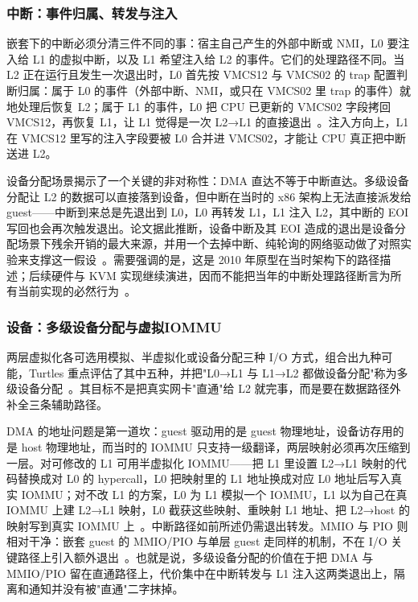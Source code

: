 \subsubsection{中断：事件归属、转发与注入}\label{sec:nested-irq}

嵌套下的中断必须分清三件不同的事：宿主自己产生的外部中断或 NMI，L0 要注入给 L1 的虚拟中断，以及 L1 希望注入给 L2 的事件。它们的处理路径不同。当 L2 正在运行且发生一次退出时，L0 首先按 VMCS12 与 VMCS02 的 trap 配置判断归属：属于 L0 的事件（外部中断、NMI，或只在 VMCS02 里 trap 的事件）就地处理后恢复 L2；属于 L1 的事件，L0 把 CPU 已更新的 VMCS02 字段拷回 VMCS12，再恢复 L1，让 L1 觉得是一次 L2→L1 的直接退出~\cite{source7}。注入方向上，L1 在 VMCS12 里写的注入字段要被 L0 合并进 VMCS02，才能让 CPU 真正把中断送进 L2。

设备分配场景揭示了一个关键的非对称性：DMA 直达不等于中断直达。多级设备分配让 L2 的数据可以直接落到设备，但中断在当时的 x86 架构上无法直接派发给 guest——中断到来总是先退出到 L0，L0 再转发 L1，L1 注入 L2，其中断的 EOI 写回也会再次触发退出。论文据此推断，设备中断及其 EOI 造成的退出是设备分配场景下残余开销的最大来源，并用一个去掉中断、纯轮询的网络驱动做了对照实验来支撑这一假设~\cite{source7}。需要强调的是，这是 2010 年原型在当时架构下的路径描述；后续硬件与 KVM 实现继续演进，因而不能把当年的中断处理路径断言为所有当前实现的必然行为~\cite{source7,source8}。

\subsubsection{设备：多级设备分配与虚拟IOMMU}\label{sec:nested-dev}

两层虚拟化各可选用模拟、半虚拟化或设备分配三种 I/O 方式，组合出九种可能，Turtles 重点评估了其中五种，并把"L0→L1 与 L1→L2 都做设备分配"称为多级设备分配~\cite{source7}。其目标不是把真实网卡"直通"给 L2 就完事，而是要在数据路径外补全三条辅助路径。

DMA 的地址问题是第一道坎：guest 驱动用的是 guest 物理地址，设备访存用的是 host 物理地址，而当时的 IOMMU 只支持一级翻译，两层映射必须再次压缩到一层。对可修改的 L1 可用半虚拟化 IOMMU——把 L1 里设置 L2→L1 映射的代码替换成对 L0 的 hypercall，L0 把映射里的 L1 地址换成对应 L0 地址后写入真实 IOMMU；对不改 L1 的方案，L0 为 L1 模拟一个 IOMMU，L1 以为自己在真 IOMMU 上建 L2→L1 映射，L0 截获这些映射、重映射 L1 地址、把 L2→host 的映射写到真实 IOMMU 上~\cite{source7}。中断路径如前所述仍需退出转发。MMIO 与 PIO 则相对干净：嵌套 guest 的 MMIO/PIO 与单层 guest 走同样的机制，不在 I/O 关键路径上引入额外退出~\cite{source7}。也就是说，多级设备分配的价值在于把 DMA 与 MMIO/PIO 留在直通路径上，代价集中在中断转发与 L1 注入这两类退出上，隔离和通知并没有被"直通"二字抹掉。


